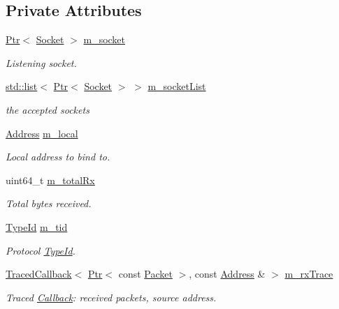 \subsection*{Private Attributes}
\begin{DoxyCompactItemize}
\item 
\hyperlink{classns3_1_1Ptr}{Ptr}$<$ \hyperlink{classns3_1_1Socket}{Socket} $>$ \hyperlink{classns3_1_1PacketSink_aeb02446587fb10cf429a39dcccb89ed0}{m\+\_\+socket}
\begin{DoxyCompactList}\small\item\em Listening socket. \end{DoxyCompactList}\item 
\hyperlink{openflow-interface_8h_afd9bcfa176617760671b67580f536fa7}{std\+::list}$<$ \hyperlink{classns3_1_1Ptr}{Ptr}$<$ \hyperlink{classns3_1_1Socket}{Socket} $>$ $>$ \hyperlink{classns3_1_1PacketSink_a510c28b6f2397952196b759a237404e9}{m\+\_\+socket\+List}
\begin{DoxyCompactList}\small\item\em the accepted sockets \end{DoxyCompactList}\item 
\hyperlink{classns3_1_1Address}{Address} \hyperlink{classns3_1_1PacketSink_a3d7ac204fd89eb95de0247caff3db927}{m\+\_\+local}
\begin{DoxyCompactList}\small\item\em Local address to bind to. \end{DoxyCompactList}\item 
uint64\+\_\+t \hyperlink{classns3_1_1PacketSink_aa0e0c557f09ac820ca13b5a500600bd1}{m\+\_\+total\+Rx}
\begin{DoxyCompactList}\small\item\em Total bytes received. \end{DoxyCompactList}\item 
\hyperlink{classns3_1_1TypeId}{Type\+Id} \hyperlink{classns3_1_1PacketSink_a1988cd4eb565f1e5ac6fd21beedf0563}{m\+\_\+tid}
\begin{DoxyCompactList}\small\item\em Protocol \hyperlink{classns3_1_1TypeId}{Type\+Id}. \end{DoxyCompactList}\item 
\hyperlink{classns3_1_1TracedCallback}{Traced\+Callback}$<$ \hyperlink{classns3_1_1Ptr}{Ptr}$<$ const \hyperlink{classns3_1_1Packet}{Packet} $>$, const \hyperlink{classns3_1_1Address}{Address} \& $>$ \hyperlink{classns3_1_1PacketSink_a8a0294426cf001db7827f4e39c46eb6e}{m\+\_\+rx\+Trace}
\begin{DoxyCompactList}\small\item\em Traced \hyperlink{classns3_1_1Callback}{Callback}\+: received packets, source address. \end{DoxyCompactList}\end{DoxyCompactItemize}
